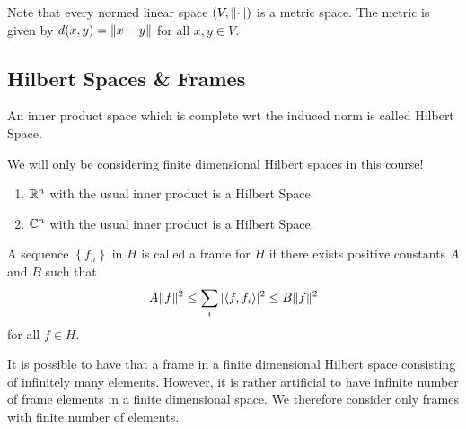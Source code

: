Note that every normed linear space $\left( V, \lVert \cdot \rVert \right)$ is a metric space. The metric is given by $d (x, y) = \lVert x-y \rVert$ for all $x,y \in V$.

\subsection{Hilbert Spaces \& Frames}

\begin{definition}
    An inner product space which is complete wrt the induced norm is called Hilbert Space.
    \label{def:Hilbert-Space}
\end{definition}

We will only be considering finite dimensional Hilbert spaces in this course!

\begin{example}
    \begin{enumerate}
	\item $\mathbb R ^n$ with the usual inner product is a Hilbert Space.
	\item $\mathbb C ^n$ with the usual inner product is a Hilbert Space.
	\end{enumerate}
\end{example}

\begin{definition}
    A sequence $\left\{ f_n \right\}$ in $H$ is called a frame for $H$ if there exists positive constants $A$ and $B$ such that
    \begin{equation}
    A\lVert f \rVert^2 \le \sum_{i} |\langle f, f_i \rangle|^2 \le B \lVert f \rVert^2
    \label{eqn:def-frame}
\end{equation}
    for all $f\in H$.
    \label{def:frame}
\end{definition}

\begin{remark}
    It is possible to have that a frame in a finite dimensional Hilbert space consisting of infinitely many elements. However, it is rather artificial to have infinite number of frame elements in a finite dimensional space. We therefore consider only frames with finite number of elements.
    \label{rem:finite-frames}
\end{remark}


